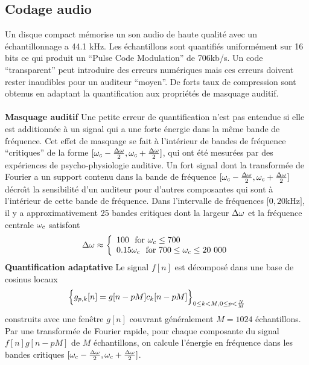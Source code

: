 \subsection{Codage audio}
\label{transparent-audio}

Un disque compact m\'emorise un son audio de haute qualit\'e
avec un \'echantillonnage a
44.1 kHz. Les \'echantillons sont quantifi\'es uniform\'ement sur
16 bits ce qui produit un
``Pulse Code Modulation'' de 706kb/s.
Un code ``transparent'' peut introduire des erreurs num\'eriques
mais ces erreurs doivent rester inaudibles pour un
auditeur ``moyen''.
De forts taux de compression sont obtenus en adaptant la 
quantification aux propri\'et\'es de masquage auditif.\\
\\
{\bf Masquage auditif}
Une petite erreur de quantification n'est pas entendue si
elle est additionn\'ee \`a un signal qui a une forte \'energie
dans la m\^eme bande de fr\'equence.
Cet effet de masquage se fait \`a l'int\'erieur de bandes
de fr\'equence ``critiques'' de la forme
$[{\omega}_c - \frac {\Delta {\omega}} 2,{\omega}_c + \frac {\Delta {\omega}} 2]$,
qui ont \'et\'e mesur\'ees 
par des exp\'eriences de psycho-physiologie
auditive.
Un fort signal dont la transform\'ee de Fourier a un support
contenu dans la bande de fr\'equence
$[{\omega}_c - \frac {\Delta {\omega}} 2,{\omega}_c + \frac {\Delta {\omega}} 2]$
d\'ecro\^{\i}t la sensibilit\'e d'un auditeur
pour d'autres composantes qui sont \`a l'int\'erieur de cette
bande de fr\'equence.
Dans l'intervalle de fr\'equences
$[0,20$kHz$]$, il y a approximativement
25 bandes critiques dont la largeur
$\Delta {\omega}$ et la fr\'equence centrale ${\omega}_c$ satisfont
\begin{equation}
\label{criticalband}
{\Delta {\omega}} \approx 
\left\{
\begin{array}{ll}
100 ~~\mbox{for ${\omega}_c \leq 700$}\\
0.15 {\omega}_c ~~\mbox{for $700 \leq {\omega}_c \leq 20~000$}
\end{array}
\right.
\end{equation}
{\bf Quantification adaptative}
Le signal $f[n]$ est d\'ecompos\'e dans une base de cosinus locaux
\[
\Bigl\{ g_{p,k} [n] = g[n-pM] c_k [n-pM]  \Bigr\}_
{{ 0 \leq k < M}, 0 \leq p < \frac N M} 
\]
construits avec une fen\^etre $g[n]$ couvrant g\'en\'eralement 
$M = 1024$ \'echantillons.
Par une transform\'ee de Fourier rapide, pour chaque
composante du signal $f[n] g[n-pM]$ de $M$ \'echantillons, 
on calcule l'\'energie en fr\'equence dans les
bandes critiques 
$[{\omega}_c - \frac{\Delta {\omega}} 2, {\omega}_c + \frac{\Delta {\omega}} 2 ]$.
